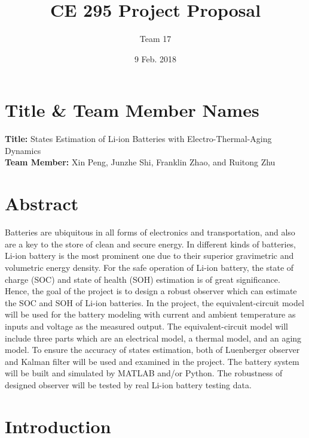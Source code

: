 \documentclass[12pt]{article}
\title{CE 295 Project Proposal}
\date{9 Feb. 2018}
\author{Team 17}
\begin{document}
	
	\maketitle
	\renewcommand\theequation{\arabic{equation}}
	\renewcommand{\figurename}{Fig.}
	\renewcommand\thesection{\Roman{section}}
	\renewcommand\thesubsection{(\alph{subsection})}
	
\section{Title \& Team Member Names}
\textbf{Title:} States Estimation of Li-ion Batteries with Electro-Thermal-Aging Dynamics\\
\textbf{Team Member:} Xin Peng, Junzhe Shi, Franklin Zhao, and Ruitong Zhu
\section{Abstract}
Batteries are ubiquitous in all forms of electronics and transportation, and also are a key to the store of clean and secure energy. In different kinds of batteries,  Li-ion battery is the most prominent one due to their superior gravimetric and volumetric energy density.  For the safe operation of Li-ion battery, the state of charge (SOC) and state of health (SOH) estimation is of great significance. Hence, the goal of the project is to design a robust observer which can estimate the SOC and SOH of Li-ion batteries. In the project, the equivalent-circuit model will be used for the battery modeling with current and ambient temperature as inputs and voltage as the measured output. The equivalent-circuit model will include three parts which are an electrical model, a thermal model, and an aging model. To ensure the accuracy of states estimation, both of Luenberger observer and Kalman filter will be used and examined in the project. The battery system will be built and simulated by MATLAB and/or Python. The robustness of designed observer will be tested by real Li-ion battery testing data.
\section{Introduction}
\end{document}
